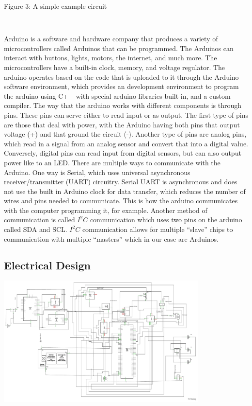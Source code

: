 \documentclass[12pt,]{article}
\begin{document}
Figure 3: A simple example circuit

~

Arduino is a software and hardware company that produces a variety of
microcontrollers called Arduinos that can be programmed. The Arduinos
can interact with buttons, lights, motors, the internet, and much more.
The microcontrollers have a built-in clock, memory, and voltage
regulator. The arduino operates based on the code that is uploaded to it
through the Arduino software environment, which provides an development
environment to program the arduino using C++ with special arduino
libraries built in, and a custom compiler. The way that the arduino
works with different components is through pins. These pins can serve
either to read input or as output. The first type of pins are those that
deal with power, with the Arduino having both pins that output voltage
(+) and that ground the circuit (-). Another type of pins are analog
pins, which read in a signal from an analog sensor and convert that into
a digital value. Conversely, digital pins can read input from digital
sensors, but can also output power like to an LED. There are multiple
ways to communicate with the Arduino. One way is Serial, which uses
universal asynchronous receiver/transmitter (UART) circuitry. Serial
UART is asynchronous and does not use the built in Arduino clock for
data transfer, which reduces the number of wires and pins needed to
communicate. This is how the arduino communicates with the computer
programming it, for example. Another method of communication is called
\(I^2C\) communication which uses two pins on the arduino called SDA and
SCL. \(I^2C\) communication allows for multiple ``slave'' chips to
communication with multiple ``masters'' which in our case are Arduinos.

\subsection{Electrical Design}\label{electrical-design}

\begin{center}\includegraphics[width=400px]{assets/schematic} \end{center}
\end{document}
